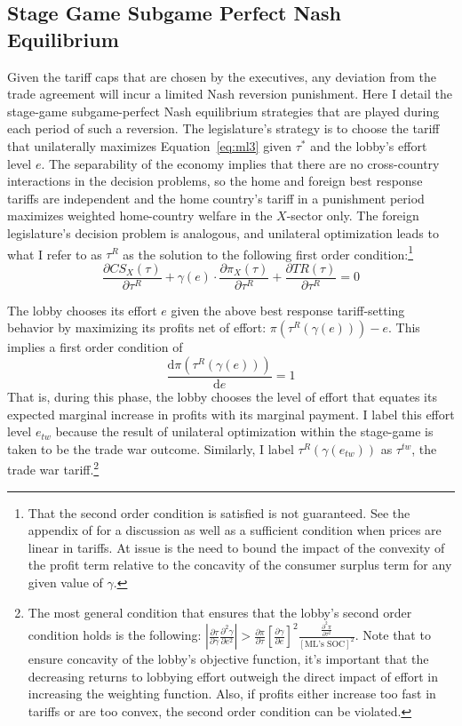\documentclass[authoryear, review]{elsarticle}
\newcommand{\ga}{\gamma}
\begin{document}
\subsection{Stage Game Subgame Perfect Nash Equilibrium}
\label{sec:stagespne}
Given the tariff caps that are chosen by the executives, any deviation from the trade agreement will incur a limited Nash reversion punishment. Here I detail the stage-game subgame-perfect Nash equilibrium strategies that are played during each period of such a reversion. The legislature's strategy is to choose the tariff that unilaterally maximizes Equation~\ref{eq:ml3} given $\tau^*$ and the lobby's effort level $e$. The separability of the economy implies that there are no cross-country interactions in the decision problems, so the home and foreign best response tariffs are independent and the home country's tariff in a punishment period maximizes weighted home-country welfare in the $X$-sector only. The foreign legislature's decision problem is analogous, and unilateral optimization leads to what I refer to as $\tau^R$ as the solution to the following first order condition:\footnote{That the second order condition is satisfied is not guaranteed. See the appendix of \citet{buzard2013b} for a discussion as well as a sufficient condition when prices are linear in tariffs. At issue is the need to bound the impact of the convexity of the profit term relative to the concavity of the consumer surplus term for any given value of $\ga$.\label{fn:legsoc}}
\begin{equation}
		\frac{\partial \mathit{CS}_X(\tau)}{\partial \tau^R} + \ga(e) \cdot \frac{\partial \pi_X(\tau)}{\partial \tau^R} +  \frac{\partial \mathit{TR}(\tau)}{\partial \tau^R} = 0
		\label{eq:leguni}
\end{equation}

The lobby chooses its effort $e$ given the above best response tariff-setting behavior by maximizing its profits net of effort: $\pi\left(\tau^R\left(\ga\left(e\right)\right)\right) - e$. This implies a first order condition of
\begin{equation}
	\frac{\mathrm{d} \pi(\tau^R(\ga(e)))}{\mathrm{d} e} = 1
  \label{eq:lobtw}
\end{equation}
That is, during this phase, the lobby chooses the level of effort that equates its expected marginal increase in profits with its marginal payment. I label this effort level $e_{tw}$ because the result of unilateral optimization within the stage-game is taken to be the trade war outcome. Similarly, I label $\tau^R(\ga(e_{tw}))$ as $\tau^{tw}$, the trade war tariff.\footnote{The most general condition that ensures that the lobby's second order condition holds is the following: $\left| \frac{\partial \tau}{\partial \ga}\frac{\partial^2 \ga}{\partial e^2}\right|>\frac{\partial \pi}{\partial \tau}\left[\frac{\partial \ga}{\partial e}\right]^2\frac{\frac{\partial^2 \pi}{\partial \tau^2}}{\left[\text{ML's SOC}\right]^2}$. Note that to ensure concavity of the lobby's objective function, it's important that the decreasing returns to lobbying effort outweigh the direct impact of effort in increasing the weighting function. Also, if profits either increase too fast in tariffs or are too convex, the second order condition can be violated.\label{fn:lobsoc}}
\end{document}
